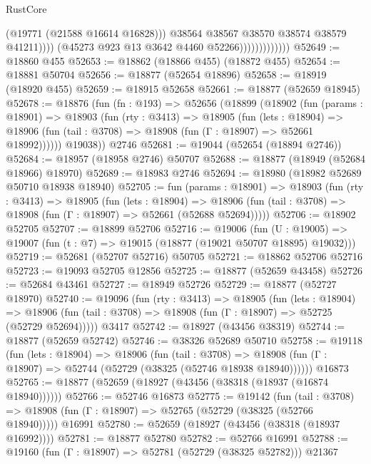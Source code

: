 \begin{lexlean}{RustCore}
\begin{coremodule}
                                      (@19771 (@21588 @16614 @16828)))
                                    @38564
                                    @38567
                                    @38570
                                    @38574
                                    @38579
                                    @41211))))
                            (@45273 @923 @13 @3642 @4460 @52266)))))))))))))
@52649 := @18860 @455
@52653 := @18862 (@18866 @455) (@18872 @455)
@52654 := @18881 @50704
@52656 := @18877 (@52654 @18896)
@52658 := @18919 (@18920 @455)
@52659 := @18915 @52658
@52661 := @18877 (@52659 @18945)
@52678 := @18876
    (fun (fn : @193) =>
    @52656
      (@18899
        (@18902
          (fun (params : @18901) =>
          @18903
            (fun (rty : @3413) =>
            @18905
              (fun (lets : @18904) =>
              @18906 (fun (tail : @3708) => @18908 (fun (Γ : @18907) => @52661 @18992))))))
        @19038))
    @2746
@52681 := @19044 (@52654 (@18894 @2746))
@52684 := @18957 (@18958 @2746) @50707
@52688 := @18877 (@18949 (@52684 @18966) @18970)
@52689 := @18983 @2746
@52694 := @18980 (@18982 @52689 @50710 @18938 @18940)
@52705 := fun (params : @18901) =>
  @18903
    (fun (rty : @3413) =>
    @18905
      (fun (lets : @18904) =>
      @18906 (fun (tail : @3708) => @18908 (fun (Γ : @18907) => @52661 (@52688 @52694)))))
@52706 := @18902 @52705
@52707 := @18899 @52706
@52716 := @19006
    (fun (U : @19005) => @19007 (fun (t : @7) => @19015 (@18877 (@19021 @50707 @18895) @19032)))
@52719 := @52681 (@52707 @52716) @50705
@52721 := @18862 @52706 @52716
@52723 := @19093 @52705 @12856
@52725 := @18877 (@52659 @43458)
@52726 := @52684 @43461
@52727 := @18949 @52726
@52729 := @18877 (@52727 @18970)
@52740 := @19096
    (fun (rty : @3413) =>
    @18905
      (fun (lets : @18904) =>
      @18906 (fun (tail : @3708) => @18908 (fun (Γ : @18907) => @52725 (@52729 @52694)))))
    @3417
@52742 := @18927 (@43456 @38319)
@52744 := @18877 (@52659 @52742)
@52746 := @38326 @52689 @50710
@52758 := @19118
    (fun (lets : @18904) =>
    @18906
      (fun (tail : @3708) =>
      @18908 (fun (Γ : @18907) => @52744 (@52729 (@38325 (@52746 @18938 @18940))))))
    @16873
@52765 := @18877 (@52659 (@18927 (@43456 (@38318 (@18937 (@16874 @18940))))))
@52766 := @52746 @16873
@52775 := @19142
    (fun (tail : @3708) => @18908 (fun (Γ : @18907) => @52765 (@52729 (@38325 (@52766 @18940)))))
    @16991
@52780 := @52659 (@18927 (@43456 (@38318 (@18937 @16992))))
@52781 := @18877 @52780
@52782 := @52766 @16991
@52788 := @19160 (fun (Γ : @18907) => @52781 (@52729 (@38325 @52782))) @21367

\end{coremodule}
\end{lexlean}
